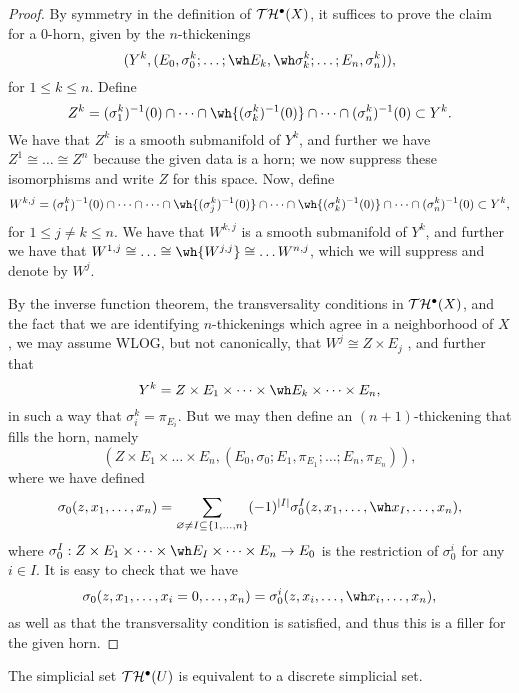 \begin{proof}
 By symmetry in the definition of $\mathcal T \mathcal H^\bullet(X)$, it suffices to prove the claim for a $0$-horn, given by the $n$-thickenings
\[ (Y^k, (E_0, \sigma_0^k; \dots; \wh E_k, \wh \sigma_k^k; \dots; E_n, \sigma_n^k)), \]
for $1 \leq k \leq n$. Define
\[ Z^k = (\sigma_1^k)^{-1}(0) \cap \dots \cap \wh {(\sigma_k^k)^{-1}(0)} \cap \dots \cap (\sigma_n^k)^{-1}(0) \subset Y^k. \]
We have that $Z^k$ is a smooth submanifold of $Y^k$, and further we have $Z^1 \cong \dots \cong Z^n$ because the given data is a horn; we now suppress these isomorphisms and write $Z$ for this space. Now, define
\[ W^{k, j} = (\sigma_1^k)^{-1}(0) \cap \dots \cap \dots \cap \wh {(\sigma_j^k)^{-1}(0)} \cap \dots \cap \wh {(\sigma_k^k)^{-1}(0)} \cap \dots \cap (\sigma_n^k)^{-1}(0) \subset Y^k, \]
for $1 \leq j \neq k \leq n$. We have that $W^{k, j}$ is a smooth submanifold of $Y^k$, and further we have that $W^{1, j} \cong \dots \cong \wh {W^{j, j}} \cong \dots W^{n, j}$, which we will suppress and denote by $W^j$.

By the inverse function theorem, the transversality conditions in $\mathcal T \mathcal H^\bullet(X)$, and the fact that we are identifying $n$-thickenings which agree in a neighborhood of $X$, we may assume WLOG, but not canonically, that $W^j \cong Z \times E_j$ \jake{[locally on X]}, and further that
\[ Y^k = Z \times E_1 \times \dots \times \wh E_k \times \dots \times E_n, \]
in such a way that $\sigma_i^k = \pi_{E_i}$. But we may then define an $(n + 1)$-thickening that fills the horn, namely
\[ \left( Z \times E_1 \times \dots \times E_n, \left( E_0, \sigma_0; E_1, \pi_{E_1}; \dots; E_n, \pi_{E_n} \right) \right), \]
where we have defined
\[\sigma_0(z, x_1, \dots, x_n) = \sum_{\varnothing \neq I \subseteq \{1, \dots, n\}} (-1)^{\abs{I}} \sigma_0^I(z, x_1, \dots, \wh x_I, \dots, x_n), \]
where $\sigma_0^I: Z \times E_1 \times \dots \times \wh E_I \times \dots \times E_n \to E_0$ is the restriction of $\sigma_0^i$ for any $i \in I$. It is easy to check that we have
\[ \sigma_0(z, x_1, \dots, x_i = 0, \dots, x_n) = \sigma_0^i(z, x_i, \dots, \wh x_i, \dots, x_n), \]
as well as that the transversality condition is satisfied, and thus this is a filler for the given horn.
\end{proof}

\begin{prop}\label{thickenings-are-discrete}
The simplicial set $\mathcal T \mathcal H^\bullet(U)$ is equivalent to a discrete simplicial set.
\end{prop}

